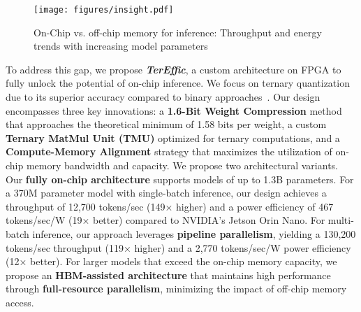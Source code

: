 \begin{figure}
    \centering
    \texttt{[image: figures/insight.pdf]}
    \caption{On-Chip vs. off-chip memory for inference: Throughput and energy trends with increasing model parameters}
    \label{fig:model size}
    \vspace{-3mm}
\end{figure} 

To address this gap, we propose \textit{\textbf{TerEffic}}, a custom architecture on FPGA to fully unlock the potential of on-chip inference.  We focus on ternary quantization due to its superior accuracy compared to binary approaches~\cite{bitnet, bitnet1.58}. Our design encompasses three key innovations: a {\bf 1.6-Bit Weight Compression} method that approaches the theoretical minimum of 1.58 bits per weight, a custom {\bf Ternary MatMul Unit (TMU)} optimized for ternary computations, and a {\bf Compute-Memory Alignment} strategy that maximizes the utilization of on-chip memory bandwidth and capacity. We propose two architectural variants. Our {\bf fully on-chip architecture} supports models of up to 1.3B parameters. For a 370M parameter model with single-batch inference, our design achieves a throughput of 12,700 tokens/sec (149× higher) and a power efficiency of 467 tokens/sec/W (19× better) compared to NVIDIA's Jetson Orin Nano. For multi-batch inference, our approach leverages {\bf pipeline parallelism}, yielding a 130,200 tokens/sec throughput (119× higher) and a 2,770 tokens/sec/W power efficiency (12× better). For larger models that exceed the on-chip memory capacity, we propose an \textbf{HBM-assisted architecture} that maintains high performance through {\bf full-resource parallelism}, minimizing the impact of off-chip memory access.



